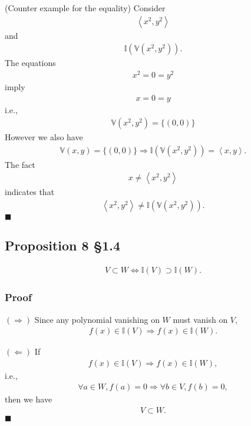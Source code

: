 \documentclass[11pt]{book}
\begin{document}
(Counter example for the equality)
Consider
\begin{eqnarray}
\left< x^2, y^2 \right>
\end{eqnarray}
and 
\begin{eqnarray}
\mathbb{I}\left( \mathbb{V} \left( x^2, y^2 \right) \right).
\end{eqnarray}
The equations
\begin{eqnarray}
x^2 = 0 = y^2
\end{eqnarray}
imply
\begin{eqnarray}
x = 0 = y
\end{eqnarray}
i.e.,
\begin{eqnarray}
\mathbb{V} \left( x^2, y^2 \right) = \{(0,0)\}
\end{eqnarray}
However we also have
\begin{eqnarray}
\mathbb{V} \left( x, y \right) = \{(0,0)\} \Rightarrow \mathbb{I}\left( \mathbb{V} \left( x^2, y^2 \right) \right) = \left< x, y \right>.
\end{eqnarray}
The fact
\begin{eqnarray}
x \neq \left< x^2, y^2 \right>
\end{eqnarray}
indicates that
\begin{eqnarray}
\left< x^2, y^2 \right> \neq \mathbb{I}\left( \mathbb{V} \left( x^2, y^2 \right) \right).
\end{eqnarray}
$\blacksquare$

\subsection{Proposition 8 \S1.4}
\begin{eqnarray}
V \subset W \Leftrightarrow \mathbb{I}(V) \supset \mathbb{I}(W).
\end{eqnarray}

\subsubsection{Proof}
$(\Rightarrow)$ Since any polynomial vanishing on $W$ must vanish on $V$,
\begin{eqnarray}
f(x) \in \mathbb{I}(V) \Rightarrow f(x) \in \mathbb{I}(W).
\end{eqnarray}

$(\Leftarrow)$
If
\begin{eqnarray}
f(x) \in \mathbb{I}(V) \Rightarrow f(x) \in \mathbb{I}(W),
\end{eqnarray}
i.e., 
\begin{eqnarray}
\forall a \in W, f(a)=0 \Rightarrow \forall b \in V, f(b) = 0,
\end{eqnarray}
then we have
\begin{eqnarray}
V \subset W.
\end{eqnarray}
$\blacksquare$
\end{document}
